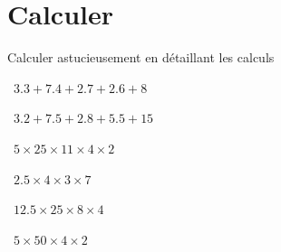 	
	\section{Calculer}
	
	Calculer astucieusement en détaillant les calculs
	\begin{questions}
		
	
%			
			
		
		\question[2]  $\num{3.3} + \num{7.4} + \num{2.7} + \num{2.6} + 8 $
		\fillwithdottedlines{2cm}
		\begin{solution}

		\end{solution}
		
		\question[2]  $\num{3.2} + \num{7.5} + \num{2.8} + \num{5.5} + 15 $
		\fillwithdottedlines{2cm}
		\begin{solution}
			
		\end{solution}
	
	
		\question[2]  $\num{5} \times 25 \times 11 \times \num{4} \times 2$
		\fillwithdottedlines{2cm}
		\begin{solution}
			
		\end{solution}
	
		\question[2]  $\num{2.5} \times 4 \times 3 \times 7$
		\fillwithdottedlines{2cm}
		\begin{solution}
			
		\end{solution}
	
	
		
	
		\question[2]  $\num{12.5} \times 25 \times \num{8} \times 4$
		\fillwithdottedlines{2cm}
		\begin{solution}
			
		\end{solution}
	
	\newpage
	
	
		\question[2]  $\num{5} \times 50  \times \num{4} \times 2$
		\fillwithdottedlines{2cm}
		\begin{solution}
			
		\end{solution}
	
		
	

\end{questions}
